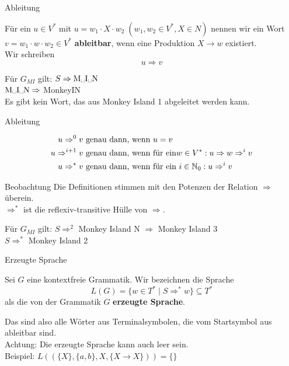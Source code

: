 \begin{frame}{Ableitung}
	\begin{Definition}
		Für ein  $u \in V^\ast$ mit $u = w_1 \cdot X \cdot w_2 \; (w_1, w_2 \in V^\ast, X \in N)$ nennen wir ein Wort $v = w_1 \cdot w \cdot w_2 \in V^\ast$ \textbf{ableitbar}, wenn eine Produktion $X \to w$ existiert.\\
		Wir schreiben $$u \Rightarrow v$$
	\end{Definition}
	
	\pause
	\begin{Beispiel}
		Für $G_{MI}$ gilt: $S \Rightarrow \text{M\textvisiblespace I\textvisiblespace N}$\\
		$ \text{M\textvisiblespace I\textvisiblespace N} \Rightarrow$ Monkey\textvisiblespace I\textvisiblespace N\\
		Es gibt kein Wort, das aus Monkey Island 1 abgeleitet werden kann.
	\end{Beispiel}
	
\end{frame}

\begin{frame}{Ableitung}	
	\begin{Definition}
		\begin{align*}
		u \Rightarrow^0 v &\text{ genau dann, wenn } u=v \\
		u \Rightarrow^{i+1} v &\text{ genau dann, wenn für ein}  w\in V^*: u \Rightarrow w \Rightarrow^i v\\
		u \Rightarrow^* v &\text{ genau dann, wenn für ein } i\in\mathbb{N}_0: u \Rightarrow^i v \\
		\end{align*}
	\end{Definition}
	
	\pause
	\begin{block}{Beobachtung}
		Die Definitionen stimmen mit den Potenzen der Relation $\Rightarrow$ überein.\\
		$\Rightarrow^\ast$ ist die reflexiv-transitive Hülle von $\Rightarrow$.
	\end{block}

	\pause
	\begin{Beispiel}
		Für $G_{MI}$ gilt: $S \Rightarrow^2$ Monkey Island N $\Rightarrow$ Monkey Island 3\\
		$S \Rightarrow^*$ Monkey Island 2
	\end{Beispiel}
\end{frame}


\begin{frame}{Erzeugte Sprache}
	\begin{Definition}
		Sei $G$ eine kontextfreie Grammatik. Wir bezeichnen die Sprache $$L(G) = \{w \in T^\ast \mid S \Rightarrow^\ast w \} \subseteq T^*$$ als die von der Grammatik $G$ \textbf{erzeugte Sprache}.
	\end{Definition} \pause
	Das sind also alle Wörter aus Terminalsymbolen, die vom Startsymbol aus ableitbar sind.\\
	Achtung: Die erzeugte Sprache kann auch leer sein. \\
	Beispiel: \pause $L\left(\left(\{X\},\{a,b\},X,\{X\to X\}\right)\right) = \{\}$
\end{frame}

